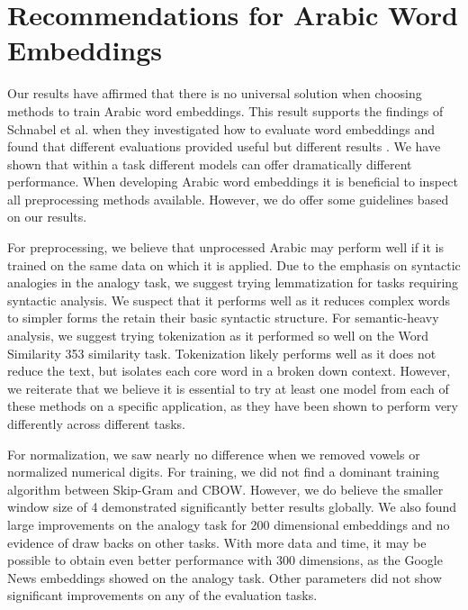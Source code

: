 \section{Recommendations for Arabic Word Embeddings}
\label{sec:recommendations}

Our results have affirmed that there is no universal solution when choosing methods to train Arabic word embeddings. This result supports the findings of Schnabel et al. when they investigated how to evaluate word embeddings and found that different evaluations provided useful but different results \cite{schnabel2015evaluation}. We have shown that within a task different models can offer dramatically different performance. When developing Arabic word embeddings it is beneficial to inspect all preprocessing methods available. However, we do offer some guidelines based on our results.

For preprocessing, we believe that unprocessed Arabic may perform well if it is trained on the same data on which it is applied. Due to the emphasis on syntactic analogies in the analogy task, we suggest trying lemmatization for tasks requiring syntactic analysis. We suspect that it performs well as it reduces complex words to simpler forms the retain their basic syntactic structure. For semantic-heavy analysis, we suggest trying tokenization as it performed so well on the Word Similarity 353 similarity task. Tokenization likely performs well as it does not reduce the text, but isolates each core word in a broken down context. However, we reiterate that we believe it is essential to try at least one model from each of these methods on a specific application, as they have been shown to perform very differently across different tasks.

For normalization, we saw nearly no difference when we removed vowels or normalized numerical digits. For training, we did not find a dominant training algorithm between Skip-Gram and CBOW. However, we do believe the smaller window size of 4 demonstrated significantly better results globally. We also found large improvements on the analogy task for 200 dimensional embeddings and no evidence of draw backs on other tasks. With more data and time, it may be possible to obtain even better performance with 300 dimensions, as the Google News embeddings showed on the analogy task. Other parameters did not show significant improvements on any of the evaluation tasks.